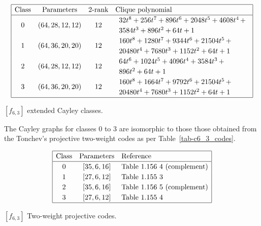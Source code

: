\documentclass[12pt,a4paper]{article}
\begin{document}
\begin{table}[!bhpt] %
%
\small{}
\begin{align*}
\def\arraystretch{1.2}
\begin{array}{|cccl|}
\hline
\text{Class} &
\text{Parameters} &
\text{2-rank} &
\text{Clique polynomial}
\\
\hline
0 &
(64, 28, 12, 12) &
12 &
\begin{array}{l}
32t^{8} + 256t^{7} + 896t^{6} + 2048t^{5} + 4608t^{4}
\,+
\\
 3584t^{3} + 896t^{2} + 64t + 1
\end{array}
\\
1 &
(64, 36, 20, 20) &
12 &
\begin{array}{l}
160t^{8} + 1280t^{7} + 9344t^{6} + 21504t^{5}
\,+
\\
 20480t^{4} + 7680t^{3} + 1152t^{2} + 64t + 1
\end{array}
\\
2 &
(64, 28, 12, 12) &
12 &
\begin{array}{l}
64t^{6} + 1024t^{5} + 4096t^{4} + 3584t^{3}
\,+
\\
 896t^{2} + 64t + 1
\end{array}
\\
3 &
(64, 36, 20, 20) &
12 &
\begin{array}{l}
160t^{8} + 1664t^{7} + 9792t^{6} + 21504t^{5}
\,+
\\
 20480t^{4} + 7680t^{3} + 1152t^{2} + 64t + 1
\end{array}
\\
\hline
\end{array}
\end{align*}
%
\caption{$[f_{6,3}]$ extended Cayley classes.}
\label{tab-c6_3_EC_classes}
\end{table}

The Cayley graphs for classes 0 to 3 are isomorphic to those those obtained from the
Tonchev's projective two-weight codes \cite{Ton07codes} as per Table~\ref{tab-c6_3_codes}.

\begin{table}[!bhpt] %
\small{
\begin{align*}
\def\arraystretch{1.2}
\begin{array}{|ccl|}
\hline
\text{Class} &
\text{Parameters} & \text{Reference}
\\
\hline
0 & [35,6,16] & \text{Table 1.156 4 (complement)}
\\
1 & [27,6,12] & \text{Table 1.155 3 }
\\
2 & [35,6,16] & \text{Table 1.156 5 (complement)}
\\
3 & [27,6,12] & \text{Table 1.155 4 }
\\
\hline
\end{array}
\end{align*}
}
\caption{$[f_{6,3}]$ Two-weight projective codes.}
\label{tab-c6_3_codes}
\end{table}
\end{document}
